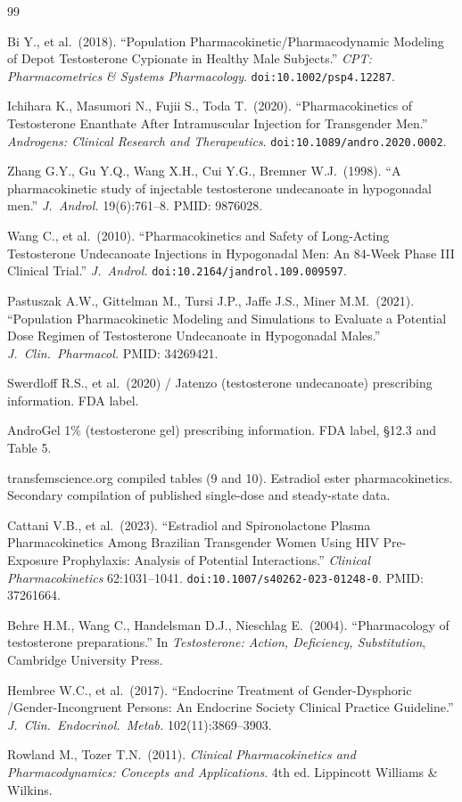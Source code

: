 \documentclass[11pt,a4paper]{article}
\begin{document}
\begin{thebibliography}{99}

Bi Y., et al.\ (2018). ``Population Pharmacokinetic/Pharmacodynamic
Modeling of Depot Testosterone Cypionate in Healthy Male Subjects.''
\emph{CPT: Pharmacometrics \& Systems Pharmacology}.
\texttt{doi:10.1002/psp4.12287}.

Ichihara K., Masumori N., Fujii S., Toda T.\ (2020). ``Pharmacokinetics
of Testosterone Enanthate After Intramuscular Injection for Transgender
Men.'' \emph{Androgens: Clinical Research and Therapeutics}.
\texttt{doi:10.1089/andro.2020.0002}.

Zhang G.Y., Gu Y.Q., Wang X.H., Cui Y.G., Bremner W.J.\ (1998). ``A
pharmacokinetic study of injectable testosterone undecanoate in
hypogonadal men.'' \emph{J.\ Androl.} 19(6):761--8.
PMID: 9876028.

Wang C., et al.\ (2010). ``Pharmacokinetics and Safety of Long-Acting
Testosterone Undecanoate Injections in Hypogonadal Men: An 84-Week
Phase III Clinical Trial.'' \emph{J.\ Androl.}
\texttt{doi:10.2164/jandrol.109.009597}.

Pastuszak A.W., Gittelman M., Tursi J.P., Jaffe J.S., Miner M.M.\
(2021). ``Population Pharmacokinetic Modeling and Simulations to
Evaluate a Potential Dose Regimen of Testosterone Undecanoate in
Hypogonadal Males.'' \emph{J.\ Clin.\ Pharmacol.}
PMID: 34269421.

Swerdloff R.S., et al.\ (2020) / Jatenzo (testosterone undecanoate)
prescribing information. FDA label.

AndroGel 1\% (testosterone gel) prescribing information. FDA label,
\S12.3 and Table 5.

transfemscience.org compiled tables (9 and 10). Estradiol ester
pharmacokinetics. Secondary compilation of published single-dose and
steady-state data.

Cattani V.B., et al.\ (2023). ``Estradiol and Spironolactone Plasma
Pharmacokinetics Among Brazilian Transgender Women Using HIV Pre-Exposure
Prophylaxis: Analysis of Potential Interactions.''
\emph{Clinical Pharmacokinetics} 62:1031--1041.
\texttt{doi:10.1007/s40262-023-01248-0}. PMID: 37261664.

Behre H.M., Wang C., Handelsman D.J., Nieschlag E.\ (2004).
``Pharmacology of testosterone preparations.'' In \emph{Testosterone:
Action, Deficiency, Substitution}, Cambridge University Press.

Hembree W.C., et al.\ (2017). ``Endocrine Treatment of Gender-Dysphoric
/Gender-Incongruent Persons: An Endocrine Society Clinical Practice
Guideline.'' \emph{J.\ Clin.\ Endocrinol.\ Metab.} 102(11):3869--3903.

Rowland M., Tozer T.N.\ (2011). \emph{Clinical Pharmacokinetics and
Pharmacodynamics: Concepts and Applications}. 4th ed. Lippincott
Williams \& Wilkins.

\end{thebibliography}
\end{document}
